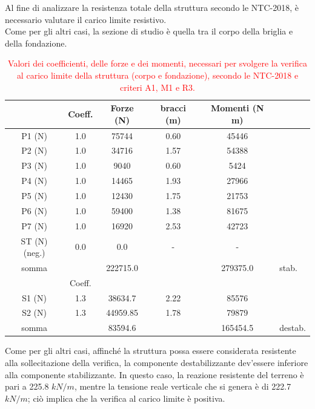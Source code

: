 Al fine di analizzare la resistenza totale della struttura secondo le NTC-2018, è necessario valutare il carico limite resistivo.\\
Come per gli altri casi, la sezione di studio è quella tra il corpo della briglia e della fondazione.

\begin{table}[H] \centering
\caption{\textcolor{red}{Valori dei coefficienti, delle forze e dei momenti, necessari per svolgere la verifica al carico limite della struttura (corpo e fondazione), secondo le NTC-2018 e criteri A1, M1 e R3.}}
    \begin{tabular}{cccccl}
\toprule
& Coeff. & Forze (N) & bracci (m) & Momenti (N m) &         \\
\midrule
P1 (N) & 1.0         & 75744     & 0.60       & 45446         &         \\
P2 (N) & 1.0         & 34716     & 1.57       & 54388         &         \\
P3 (N) & 1.0         & 9040      & 0.60       & 5424          &         \\
P4 (N) & 1.0         & 14465     & 1.93       & 27966         &         \\
P5 (N) & 1.0         & 12430     & 1.75       & 21753         &         \\
P6 (N) & 1.0         & 59400     & 1.38       & 81675         &         \\
P7 (N) & 1.0         & 16920     & 2.53       & 42723         &         \\
ST (N) (neg.) & 0.0  & 0.0       & -          & -             &         \\
somma         &      & 222715.0  &            & 279375.0      & stab.   \\
\midrule
& Coeff. &     &            &               &         \\
S1 (N)        & 1.3  & 38634.7   & 2.22       & 85576         &         \\
S2 (N)        & 1.3  & 44959.85  & 1.78       & 79879         &         \\
somma         &      & 83594.6   &            & 165454.5      & destab. \\
\bottomrule
    \end{tabular}
    \end{table}

Come per gli altri casi, affinché la struttura possa essere considerata resistente alla sollecitazione della verifica, la componente destabilizzante dev'essere inferiore alla componente stabilizzante. In questo caso, la reazione resistente del terreno è pari a 225.8 $kN/m$, mentre la tensione reale verticale che si genera è di 222.7 $kN/m$; ciò implica che la verifica al carico limite è positiva.